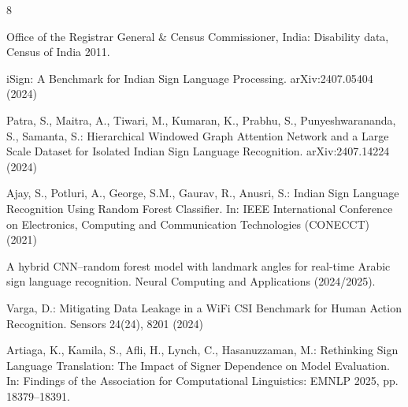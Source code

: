 \documentclass[runningheads]{llncs}
\begin{document}
\begin{thebibliography}{8}

Office of the Registrar General \& Census Commissioner, India: Disability
data, Census of India 2011.

iSign: A Benchmark for Indian Sign Language Processing. arXiv:2407.05404
(2024)

Patra, S., Maitra, A., Tiwari, M., Kumaran, K., Prabhu, S.,
Punyeshwarananda, S., Samanta, S.: Hierarchical Windowed Graph Attention
Network and a Large Scale Dataset for Isolated Indian Sign Language
Recognition. arXiv:2407.14224 (2024)

Ajay, S., Potluri, A., George, S.M., Gaurav, R., Anusri, S.: Indian Sign
Language Recognition Using Random Forest Classifier. In: IEEE
International Conference on Electronics, Computing and Communication
Technologies (CONECCT) (2021)

A hybrid CNN--random forest model with landmark angles for real-time
Arabic sign language recognition. Neural Computing and Applications
(2024/2025). 

Varga, D.: Mitigating Data Leakage in a WiFi CSI Benchmark for Human
Action Recognition. Sensors 24(24), 8201 (2024)

Artiaga, K., Kamila, S., Afli, H., Lynch, C., Hasanuzzaman, M.: Rethinking
Sign Language Translation: The Impact of Signer Dependence on Model
Evaluation. In: Findings of the Association for Computational
Linguistics: EMNLP 2025, pp. 18379--18391.

\end{thebibliography}
\end{document}
